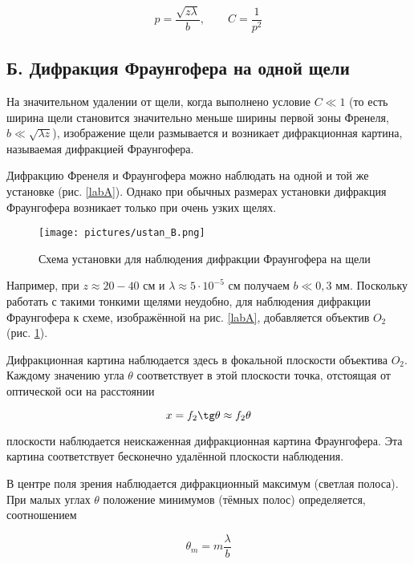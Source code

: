 \documentclass[a4paper,12pt]{article}
\begin{document}
\begin{equation}\label{}
p = \dfrac{\sqrt{z \lambda}}{b}, \qquad C = \dfrac{1}{p^2}
\end{equation}




\subsection*{Б. Дифракция Фраунгофера на одной щели}

На значительном удалении от щели, когда выполнено условие $ C \ll 1 $
(то есть ширина щели становится значительно меньше ширины первой
зоны Френеля, $ b \ll \sqrt{\lambda z} $), изображение щели размывается и возникает
дифракционная картина, называемая дифракцией Фраунгофера.

Дифракцию Френеля и Фраунгофера можно наблюдать на одной
и той же установке (рис. \ref{labA}). Однако при обычных размерах установки дифракция Фраунгофера возникает только при очень узких щелях.

\FloatBarrier
\begin{figure}[h]
	\centering
	\texttt{[image: pictures/ustan\_B.png]}
	\caption{Схема установки для наблюдения дифракции Фраунгофера на щели}
	\label{labB}
\end{figure}
\FloatBarrier

Например, при $ z \approx  20-40 $  см и $  \lambda \approx 5 \cdot 10^{-5}  $   см получаем $  b \ll 0,3 $ мм. Поскольку работать с такими тонкими щелями неудобно, для наблюдения дифракции Фраунгофера к схеме, изображённой на рис. \ref{labA}, добавляется объектив $ O_2  $ (рис. \ref{labB}).

Дифракционная картина наблюдается здесь в фокальной плоскости
объектива $ O_2 $. Каждому значению угла $ \theta $ соответствует в этой плоскости точка, отстоящая от оптической оси на расстоянии

\begin{equation}\label{x}
x = f_2 \tg \theta \approx f_2 \theta
\end{equation}


плоскости наблюдается неискаженная дифракционная картина Фраунгофера. Эта картина соответствует бесконечно удалённой плоскости
наблюдения.

В центре поля зрения наблюдается дифракционный максимум (светлая полоса). При малых углах $ \theta $ положение минимумов (тёмных полос)
определяется, соотношением

\begin{equation}\label{theta_m}
\theta_m = m \dfrac{\lambda}{b}
\end{equation}
\end{document}
